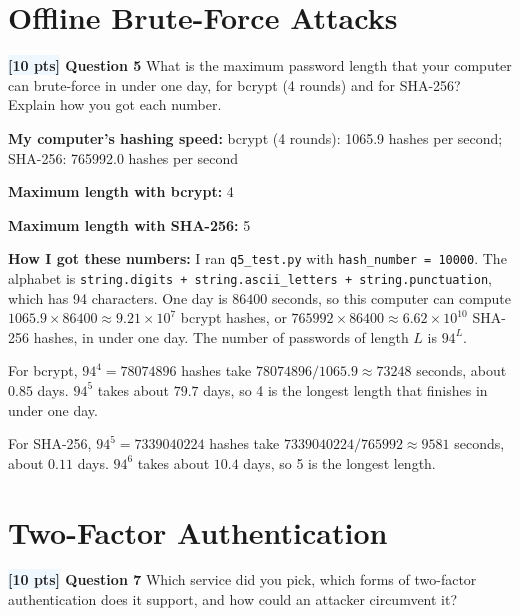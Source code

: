 \documentclass[12pt]{article}
\newcommand{\question}[2]{\textbf{\colorbox{aliceblue}{[#2 pts]} Question #1}}
\begin{document}
\section{Offline Brute-Force Attacks}

\question{5}{10} What is the maximum password length that your computer can brute-force in under one day, for bcrypt (4 rounds) and for SHA-256? Explain how you got each number.

\begin{answer}
    \textbf{My computer's hashing speed:} bcrypt (4 rounds): 1065.9 hashes per second; SHA-256: 765992.0 hashes per second

    \textbf{Maximum length with bcrypt:} 4

    \textbf{Maximum length with SHA-256:} 5

    \textbf{How I got these numbers:}
    I ran \texttt{q5\_test.py} with \texttt{hash\_number = 10000}.
    The alphabet is \texttt{string.digits + string.ascii\_letters + string.punctuation}, which has 94 characters.
    One day is \(86400\) seconds, so this computer can compute \(1065.9 \times 86400 \approx 9.21 \times 10^{7}\) bcrypt hashes, or \(765992 \times 86400 \approx 6.62 \times 10^{10}\) SHA-256 hashes, in under one day.
    The number of passwords of length \(L\) is \(94^{L}\).

    For bcrypt, \(94^{4} = 78074896\) hashes take \(78074896 / 1065.9 \approx 73248\) seconds, about \(0.85\) days.
    \(94^{5}\) takes about \(79.7\) days, so 4 is the longest length that finishes in under one day.

    For SHA-256, \(94^{5} = 7339040224\) hashes take \(7339040224 / 765992 \approx 9581\) seconds, about \(0.11\) days.
    \(94^{6}\) takes about \(10.4\) days, so 5 is the longest length.
\end{answer}

\section{Two-Factor Authentication}

\question{7}{10} Which service did you pick, which forms of two-factor authentication does it support, and how could an attacker circumvent it?
\end{document}

